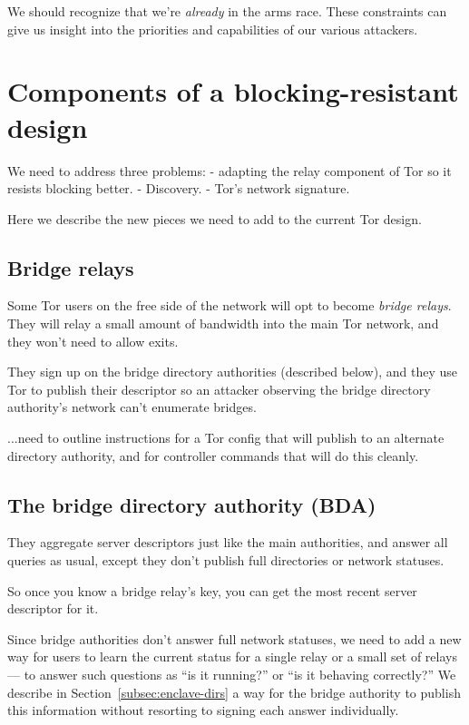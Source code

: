 \documentclass{llncs}
\begin{document}
We should recognize that we're \emph{already} in the arms race. These
constraints can give us insight into the priorities and capabilities of
our various attackers.

\section{Components of a blocking-resistant design}
\label{sec:components}

We need to address three problems:
- adapting the relay component of Tor so it resists blocking better.
- Discovery.
- Tor's network signature.

Here we describe the new pieces we need to add to the current Tor design.

\subsection{Bridge relays}

Some Tor users on the free side of the network will opt to become
\emph{bridge relays}. They will relay a small amount of bandwidth into
the main Tor network, and they won't need to allow exits.

They sign up on the bridge directory authorities (described below),
and they use Tor to publish their descriptor so an attacker observing
the bridge directory authority's network can't enumerate bridges.

...need to outline instructions for a Tor config that will publish
to an alternate directory authority, and for controller commands
that will do this cleanly.

\subsection{The bridge directory authority (BDA)}

They aggregate server descriptors just like the main authorities, and
answer all queries as usual, except they don't publish full directories
or network statuses.

So once you know a bridge relay's key, you can get the most recent
server descriptor for it.

Since bridge authorities don't answer full network statuses, we
need to add a new way for users to learn the current status for a
single relay or a small set of relays --- to answer such questions as
``is it running?''  or ``is it behaving correctly?'' We describe in
Section~\ref{subsec:enclave-dirs} a way for the bridge authority to
publish this information without resorting to signing each answer
individually.
\end{document}
